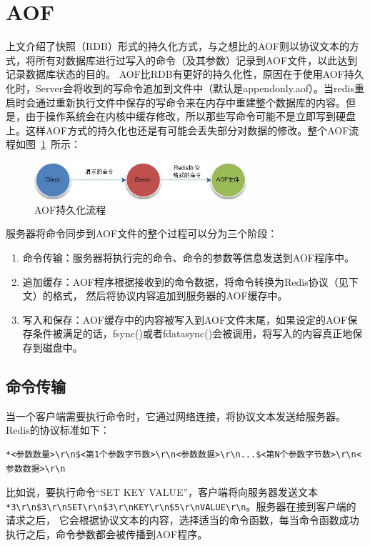 \documentclass{zjutthesis}
\begin{document}
\section{AOF}
上文介绍了快照（RDB）形式的持久化方式，与之想比的AOF则以协议文本的方式，将所有对数据库进行过写入的命令（及其参数）记录到AOF文件，以此达到记录数据库状态的目的。
AOF比RDB有更好的持久化性，原因在于使用AOF持久化时，Server会将收到的写命令追加到文件中（默认是appendonly.aof）。当redis重启时会通过重新执行文件中保存的写命令来在内存中重建整个数据库的内容。但是，由于操作系统会在内核中缓存修改，所以那些写命令可能不是立即写到硬盘上。这样AOF方式的持久化也还是有可能会丢失部分对数据的修改。整个AOF流程如图~\ref{fig:AOF}~所示：
\begin{figure}[H]
\centering
\includegraphics[width=0.7\textwidth]{AOF}
\caption{AOF持久化流程}\label{fig:AOF}
\vspace{\baselineskip} %
\end{figure}

服务器将命令同步到AOF文件的整个过程可以分为三个阶段：
\begin{enumerate}[label=\arabic*.]
\item{命令传输：服务器将执行完的命令、命令的参数等信息发送到AOF程序中。}
\item{追加缓存：AOF程序根据接收到的命令数据，将命令转换为Redis协议（见下文）的格式，
然后将协议内容追加到服务器的AOF缓存中。}
\item{写入和保存：AOF缓存中的内容被写入到AOF文件末尾，如果设定的AOF保存条件被满足的话，fsync()或者fdatasync()会被调用，将写入的内容真正地保存到磁盘中。}
\end{enumerate}

\subsection{命令传输}
当一个客户端需要执行命令时，它通过网络连接，将协议文本发送给服务器。Redis的协议标准如下：
\begin{verbatim}
*<参数数量>\r\n$<第1个参数字节数>\r\n<参数数据>\r\n...$<第N个参数字节数>\r\n<参数数据>\r\n
\end{verbatim}
比如说，要执行命令“SET KEY VALUE”，客户端将向服务器发送文本\verb|*3\r\n$3\r\nSET\r\n$3\r\nKEY\r\n$5\r\nVALUE\r\n|。服务器在接到客户端的请求之后，
它会根据协议文本的内容，选择适当的命令函数，每当命令函数成功执行之后，命令参数都会被传播到AOF程序。
\end{document}
